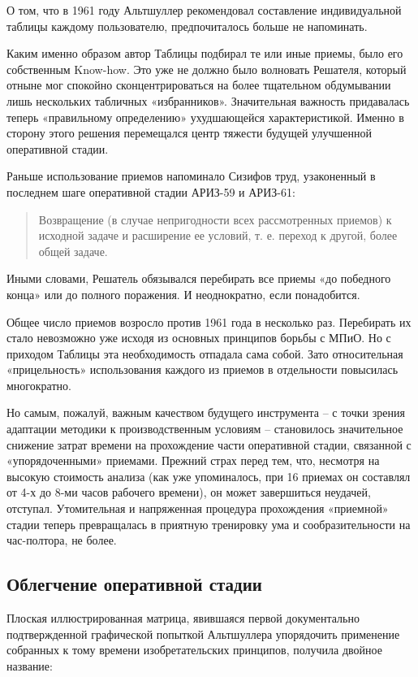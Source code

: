 \documentclass[11pt,a4paper]{article}
\begin{document}
О том, что в 1961 году Альтшуллер рекомендовал составление индивидуальной
таблицы каждому пользователю, предпочиталось больше не напоминать.

Каким именно образом автор Таблицы подбирал те или иные приемы, было его
собственным Know-how. Это уже не должно было волновать Решателя, который
отныне мог спокойно сконцентрироваться на более тщательном обдумывании лишь
нескольких табличных «избранников». Значительная важность придавалась теперь
«правильному определению» ухудшающейся характеристикой. Именно в сторону этого
решения перемещался центр тяжести будущей улучшенной оперативной стадии.

Раньше использование приемов напоминало Сизифов труд, узаконенный в последнем
шаге оперативной стадии АРИЗ-59 и АРИЗ-61:
\begin{quote}
  Возвращение (в случае непригодности всех рассмотренных приемов) к исходной
  задаче и расширение ее условий, т. е. переход к другой, более общей задаче.
\end{quote}
Иными словами, Решатель обязывался перебирать все приемы «до победного конца»
или до полного поражения. И неоднократно, если понадобится.

Общее число приемов возросло против 1961 года в несколько раз. Перебирать их
стало невозможно уже исходя из основных принципов борьбы с МПиО. Но с приходом
Таблицы эта необходимость отпадала сама собой. Зато относительная
«прицельность» использования каждого из приемов в отдельности повысилась
многократно.

Но самым, пожалуй, важным качеством будущего инструмента -- с точки зрения
адаптации методики к производственным условиям -- становилось значительное
снижение затрат времени на прохождение части оперативной стадии, связанной с
«упорядоченными» приемами. Прежний страх перед тем, что, несмотря на высокую
стоимость анализа (как уже упоминалось, при 16 приемах он составлял от 4-х до
8-ми часов рабочего времени), он может завершиться неудачей, отступал.
Утомительная и напряженная процедура прохождения «приемной» стадии теперь
превращалась в приятную тренировку ума и сообразительности на час-полтора, не
более.

\subsection*{Облегчение оперативной стадии}

Плоская иллюстрированная матрица, явившаяся первой документально
подтвержденной графической попыткой Альтшуллера упорядочить применение
собранных к тому времени изобретательских принципов, получила двойное
название:
\end{document}
